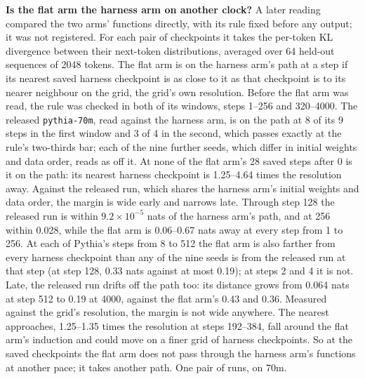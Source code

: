 \documentclass[11pt]{article}
\begin{document}
\textbf{Is the flat arm the harness arm on another clock?} A later reading compared the two arms' functions directly, with its rule fixed before any output; it was not registered. For each pair of checkpoints it takes the per-token KL divergence between their next-token distributions, averaged over 64 held-out sequences of 2048 tokens. The flat arm is on the harness arm's path at a step if its nearest saved harness checkpoint is as close to it as that checkpoint is to its nearer neighbour on the grid, the grid's own resolution. Before the flat arm was read, the rule was checked in both of its windows, steps 1--256 and 320--4000. The released \texttt{pythia-70m}, read against the harness arm, is on the path at 8 of its 9 steps in the first window and 3 of 4 in the second, which passes exactly at the rule's two-thirds bar; each of the nine further seeds, which differ in initial weights and data order, reads as off it. At none of the flat arm's 28 saved steps after 0 is it on the path: its nearest harness checkpoint is 1.25--4.64 times the resolution away. Against the released run, which shares the harness arm's initial weights and data order, the margin is wide early and narrows late. Through step 128 the released run is within $9.2 \times 10^{-5}$ nats of the harness arm's path, and at 256 within 0.028, while the flat arm is 0.06--0.67 nats away at every step from 1 to 256. At each of Pythia's steps from 8 to 512 the flat arm is also farther from every harness checkpoint than any of the nine seeds is from the released run at that step (at step 128, 0.33 nats against at most 0.19); at steps 2 and 4 it is not. Late, the released run drifts off the path too: its distance grows from 0.064 nats at step 512 to 0.19 at 4000, against the flat arm's 0.43 and 0.36. Measured against the grid's resolution, the margin is not wide anywhere. The nearest approaches, 1.25--1.35 times the resolution at steps 192--384, fall around the flat arm's induction and could move on a finer grid of harness checkpoints. So at the saved checkpoints the flat arm does not pass through the harness arm's functions at another pace; it takes another path. One pair of runs, on 70m.
\end{document}
